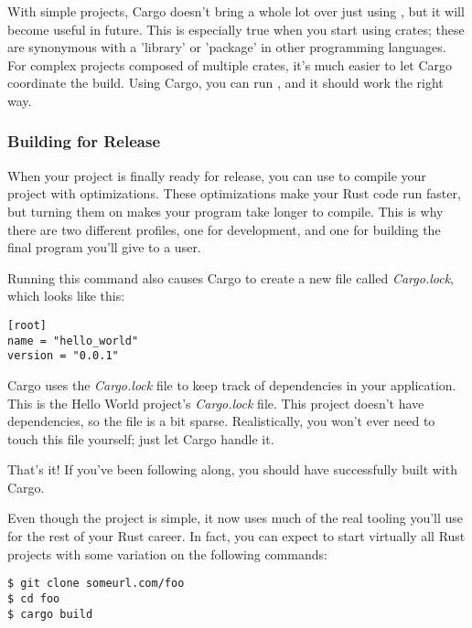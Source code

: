 \blank

With simple projects, Cargo doesn't bring a whole lot over just using , but it will become useful in future. This 
is especially true when you start using crates; these are synonymous with a 'library' or 'package' in other programming languages. 
For complex projects composed of multiple crates, it's much easier to let Cargo coordinate the build. Using Cargo, you can run 
, and it should work the right way.

\subsubsection*{Building for Release}

When your project is finally ready for release, you can use  to compile your project with optimizations. 
These optimizations make your Rust code run faster, but turning them on makes your program take longer to compile. This is why 
there are two different profiles, one for development, and one for building the final program you'll give to a user.

\blank

Running this command also causes Cargo to create a new file called \emph{Cargo.lock}, which looks like this:

\begin{verbatim}
[root]
name = "hello_world"
version = "0.0.1"
\end{verbatim}

Cargo uses the \emph{Cargo.lock} file to keep track of dependencies in your application. This is the Hello World project's 
\emph{Cargo.lock} file. This project doesn't have dependencies, so the file is a bit sparse. Realistically, you won't ever 
need to touch this file yourself; just let Cargo handle it.

\blank

That's it! If you've been following along, you should have successfully built  with Cargo.

\blank

Even though the project is simple, it now uses much of the real tooling you'll use for the rest of your Rust career. 
In fact, you can expect to start virtually all Rust projects with some variation on the following commands:

\begin{verbatim}
$ git clone someurl.com/foo
$ cd foo
$ cargo build 
\end{verbatim}

